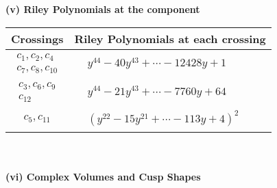 \documentclass[1p]{elsarticle_modified}
\theoremstyle{definition}
\begin{document}
\newpage\renewcommand{\arraystretch}{1}
\flushleft \textbf{(v) Riley Polynomials at the component}\newline \\
\begin{tabular}{m{50pt}|m{274pt}}
Crossings & \hspace{64pt}Riley Polynomials at each crossing \\
\hline $$\begin{aligned}c_{1},c_{2},c_{4}\\c_{7},c_{8},c_{10}\end{aligned}$$&$\begin{aligned}
&y^{44}-40 y^{43}+\cdots-12428 y+1
\end{aligned}$\\
\hline $$\begin{aligned}c_{3},c_{6},c_{9}\\c_{12}\end{aligned}$$&$\begin{aligned}
&y^{44}-21 y^{43}+\cdots-7760 y+64
\end{aligned}$\\
\hline $$\begin{aligned}c_{5},c_{11}\end{aligned}$$&$\begin{aligned}
&(y^{22}-15 y^{21}+\cdots-113 y+4)^{2}
\end{aligned}$\\
\hline
\end{tabular}\\~\\
\newpage\flushleft \textbf{(vi) Complex Volumes and Cusp Shapes}
\end{document}
